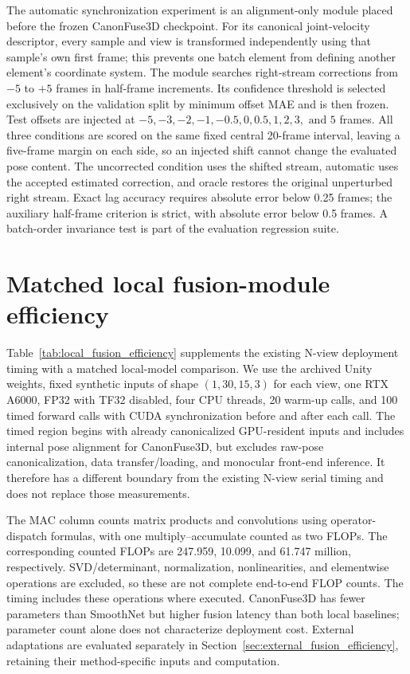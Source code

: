 \documentclass[11pt,letterpaper]{article}
\begin{document}
The automatic synchronization experiment is an alignment-only module placed before the frozen CanonFuse3D checkpoint. For its canonical joint-velocity descriptor, every sample and view is transformed independently using that sample's own first frame; this prevents one batch element from defining another element's coordinate system. The module searches right-stream corrections from \(-5\) to \(+5\) frames in half-frame increments. Its confidence threshold is selected exclusively on the validation split by minimum offset MAE and is then frozen. Test offsets are injected at \(-5,-3,-2,-1,-0.5,0,0.5,1,2,3,\text{ and }5\) frames. All three conditions are scored on the same fixed central 20-frame interval, leaving a five-frame margin on each side, so an injected shift cannot change the evaluated pose content. The uncorrected condition uses the shifted stream, automatic uses the accepted estimated correction, and oracle restores the original unperturbed right stream. Exact lag accuracy requires absolute error below 0.25 frames; the auxiliary half-frame criterion is strict, with absolute error below 0.5 frames. A batch-order invariance test is part of the evaluation regression suite.


\section{Matched local fusion-module efficiency}
\label{sec:local_fusion_efficiency}

Table~\ref{tab:local_fusion_efficiency} supplements the existing N-view deployment timing with a matched local-model comparison. We use the archived Unity weights, fixed synthetic inputs of shape $(1,30,15,3)$ for each view, one RTX A6000, FP32 with TF32 disabled, four CPU threads, 20 warm-up calls, and 100 timed forward calls with CUDA synchronization before and after each call. The timed region begins with already canonicalized GPU-resident inputs and includes internal pose alignment for CanonFuse3D, but excludes raw-pose canonicalization, data transfer/loading, and monocular front-end inference. It therefore has a different boundary from the existing N-view serial timing and does not replace those measurements.

The MAC column counts matrix products and convolutions using operator-dispatch formulas, with one multiply--accumulate counted as two FLOPs. The corresponding counted FLOPs are 247.959, 10.099, and 61.747 million, respectively. SVD/determinant, normalization, nonlinearities, and elementwise operations are excluded, so these are not complete end-to-end FLOP counts. The timing includes these operations where executed. CanonFuse3D has fewer parameters than SmoothNet but higher fusion latency than both local baselines; parameter count alone does not characterize deployment cost. External adaptations are evaluated separately in Section~\ref{sec:external_fusion_efficiency}, retaining their method-specific inputs and computation.
\end{document}
